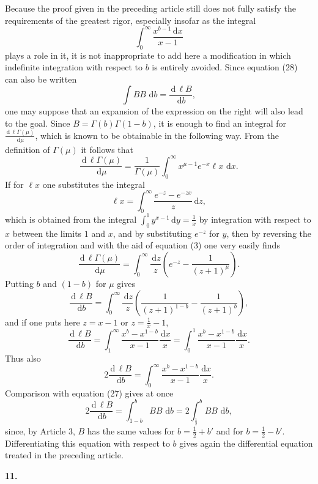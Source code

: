 \documentclass[11pt]{article}
\newcommand{\dd}{\,\mathrm d}
\newcommand{\art}[1]{\bigskip\begin{center}\large\bfseries #1.\end{center}\nopagebreak}
\begin{document}
Because the proof given in the preceding article still does not fully satisfy the requirements of the greatest rigor, especially insofar as the integral
\[
\int_0^\infty\frac{x^{b-1}\dd x}{x-1}
\]
plays a role in it, it is not inappropriate to add here a modification in which indefinite integration with respect to $b$ is entirely avoided. Since equation (28) can also be written
\[
\int B B\,\dd b=\frac{\dd\,\ell B}{\dd b},
\]
one may suppose that an expansion of the expression on the right will also lead to the goal. Since $B=\Gamma(b)\Gamma(1-b)$, it is enough to find an integral for $\frac{\dd\,\ell\Gamma(\mu)}{\dd\mu}$, which is known to be obtainable in the following way. From the definition of $\Gamma(\mu)$ it follows that
\[
\frac{\dd\,\ell\Gamma(\mu)}{\dd\mu}
=\frac1{\Gamma(\mu)}
  \int_0^\infty x^{\mu-1}e^{-x}\ell x\,\dd x.
\]
If for $\ell x$ one substitutes the integral
\[
\ell x=\int_0^\infty\frac{e^{-z}-e^{-zx}}{z}\dd z,
\]
which is obtained from the integral $\int_0^1y^{x-1}\dd y=\frac1x$ by integration with respect to $x$ between the limits $1$ and $x$, and by substituting $e^{-z}$ for $y$, then by reversing the order of integration and with the aid of equation (3) one very easily finds
\[
\frac{\dd\,\ell\Gamma(\mu)}{\dd\mu}
=\int_0^\infty\frac{\dd z}{z}
\left(e^{-z}-\frac1{(z+1)^\mu}\right).
\]
Putting $b$ and $(1-b)$ for $\mu$ gives
\[
\frac{\dd\,\ell B}{\dd b}
=\int_0^\infty\frac{\dd z}{z}
\left(\frac1{(z+1)^{1-b}}-\frac1{(z+1)^b}\right),
\]
and if one puts here $z=x-1$ or $z=\frac1x-1$,
\[
\frac{\dd\,\ell B}{\dd b}
=\int_1^\infty\frac{x^b-x^{1-b}}{x-1}\frac{\dd x}{x}
=\int_0^1\frac{x^b-x^{1-b}}{x-1}\frac{\dd x}{x}.
\]
Thus also
\[
2\frac{\dd\,\ell B}{\dd b}
=\int_0^\infty\frac{x^b-x^{1-b}}{x-1}\frac{\dd x}{x}.
\]
Comparison with equation (27) gives at once
\begin{equation}
2\frac{\dd\,\ell B}{\dd b}
=\int_{1-b}^{b} B B\,\dd b
=2\int_{\frac12}^{b} B B\,\dd b,
\tag{29}
\end{equation}
since, by Article 3, $B$ has the same values for $b=\frac12+b'$ and for $b=\frac12-b'$. Differentiating this equation with respect to $b$ gives again the differential equation treated in the preceding article.

\art{11}
\end{document}
